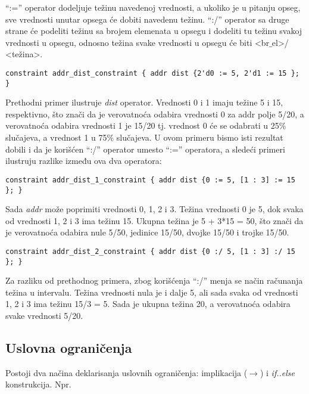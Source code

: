 ``:='' operator dodeljuje težinu navedenoj vrednosti, a ukoliko je u pitanju
opseg, sve vrednosti unutar opsega će dobiti navedenu težinu. ``:/'' operator sa
druge strane će podeliti težinu sa brojem elemenata u opsegu i dodeliti tu
težinu svakoj vrednosti u opsegu, odnosno težina svake vrednosti u opsegu će
biti \textless br\(\_\)el\textgreater / \textless težina\textgreater.

\begin{lstlisting}
constraint addr_dist_constraint { addr dist {2'd0 := 5, 2'd1 := 15 }; }
\end{lstlisting}

Prethodni primer ilustruje \emph{dist} operator. Vrednosti 0 i 1 imaju težine 5
i 15, respektivno, što znači da je verovatnoća odabira vrednosti 0 za addr polje
5/20, a verovatnoća odabira vrednosti 1 je 15/20 tj. vrednost 0 će se odabrati u
25\% slučajeva, a vrednost 1 u 75\% slučajeva. U ovom primeru bismo isti
rezultat dobili i da je korišćen ``:/'' operator umesto ``:='' operatora, a
sledeći primeri ilustruju razlike između ova dva operatora:

\begin{lstlisting}
constraint addr_dist_1_constraint { addr dist {0 := 5, [1 : 3] := 15 }; }
\end{lstlisting}

Sada \emph{addr} može poprimiti vrednosti 0, 1, 2 i 3. Težina vrednosti 0 je 5,
dok svaka od vrednosti 1, 2 i 3 ima težinu 15. Ukupna težina je 5 + 3*15 = 50,
što znači da je verovatnoća odabira nule 5/50, jedinice 15/50, dvojke 15/50 i
trojke 15/50.

\begin{lstlisting}
constraint addr_dist_2_constraint { addr dist {0 :/ 5, [1 : 3] :/ 15 }; }
\end{lstlisting}

Za razliku od prethodnog primera, zbog korišćenja ``:/'' menja se način
računanja težina u intervalu. Težina vrednosti nula je i dalje 5, ali sada svaka
od vrednosti 1, 2 i 3 ima težinu 15/3 = 5. Sada je ukupna težina 20, a
verovatnoća odabira svake vrednosti 5/20.


\subsection{Uslovna ograničenja}

Postoji dva načina deklarisanja uslovnih ograničenja: implikacija
(\(\rightarrow\)) i \emph{if..else} konstrukcija. Npr.

